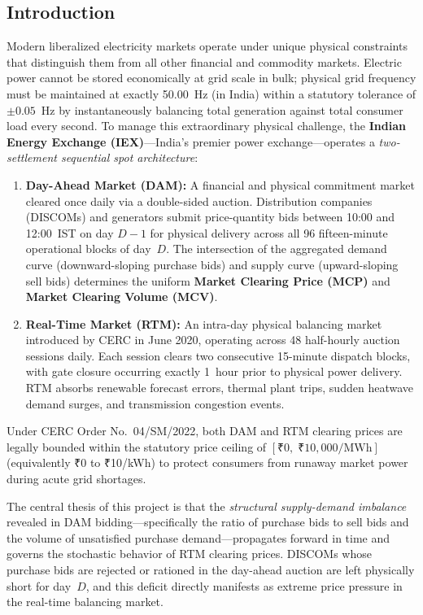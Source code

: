 \documentclass[12pt, a4paper]{article}
\theoremstyle{definition}
\newcommand{\MWh}{\text{MWh}}
\begin{document}
\subsection{Introduction}

Modern liberalized electricity markets operate under unique physical constraints that distinguish them from all other financial and commodity markets. Electric power cannot be stored economically at grid scale in bulk; physical grid frequency must be maintained at exactly 50.00~Hz (in India) within a statutory tolerance of $\pm 0.05$~Hz by instantaneously balancing total generation against total consumer load every second. To manage this extraordinary physical challenge, the \textbf{Indian Energy Exchange (IEX)}---India's premier power exchange---operates a \emph{two-settlement sequential spot architecture}:

\begin{enumerate}[label=(\roman*)]
    \item \textbf{Day-Ahead Market (DAM):} A financial and physical commitment market cleared once daily via a double-sided auction. Distribution companies (DISCOMs) and generators submit price-quantity bids between 10:00 and 12:00~IST on day $D-1$ for physical delivery across all 96 fifteen-minute operational blocks of day~$D$. The intersection of the aggregated demand curve (downward-sloping purchase bids) and supply curve (upward-sloping sell bids) determines the uniform \textbf{Market Clearing Price (MCP)} and \textbf{Market Clearing Volume (MCV)}.

    \item \textbf{Real-Time Market (RTM):} An intra-day physical balancing market introduced by CERC in June 2020, operating across 48 half-hourly auction sessions daily. Each session clears two consecutive 15-minute dispatch blocks, with gate closure occurring exactly 1~hour prior to physical power delivery. RTM absorbs renewable forecast errors, thermal plant trips, sudden heatwave demand surges, and transmission congestion events.
\end{enumerate}

Under CERC Order No.~04/SM/2022, both DAM and RTM clearing prices are legally bounded within the statutory price ceiling of $[\text{₹}0, \; \text{₹}10{,}000/\MWh]$ (equivalently ₹0 to ₹10/kWh) to protect consumers from runaway market power during acute grid shortages.

The central thesis of this project is that the \emph{structural supply-demand imbalance} revealed in DAM bidding---specifically the ratio of purchase bids to sell bids and the volume of unsatisfied purchase demand---propagates forward in time and governs the stochastic behavior of RTM clearing prices. DISCOMs whose purchase bids are rejected or rationed in the day-ahead auction are left physically short for day~$D$, and this deficit directly manifests as extreme price pressure in the real-time balancing market.
\end{document}
